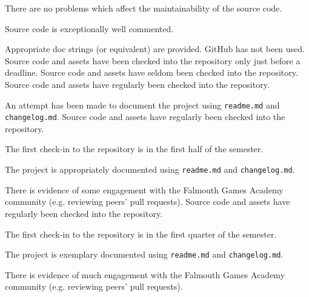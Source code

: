 \documentclass{../fal_assignment}
\begin{document}
\begin{markingrubric}
        \grade 		There are no problems which affect the maintainability of the source code.
        \par 		Source code is exceptionally well commented.
        \par 		Appropriate doc strings (or equivalent) are provided. 
%
        \grade\fail 	GitHub has not been used.
        \grade 		Source code and assets have been checked into the repository only just before a deadline.
        \grade 		Source code and assets have seldom been checked into the repository.
        \grade 		Source code and assets have regularly been checked into the repository.
        \par 		An attempt has been made to document the project using \texttt{readme.md} and \texttt{changelog.md}.
        \grade 		Source code and assets have regularly been checked into the repository.
        \par  		The first check-in to the repository is in the first half of the semester.
        \par 		The project is appropriately documented using \texttt{readme.md} and \texttt{changelog.md}.
        \par 		There is evidence of some engagement with the Falmouth Games Academy community (e.g. reviewing peers' pull requests).
        \grade 		Source code and assets have regularly been checked into the repository.
        \par  		The first check-in to the repository is in the first quarter of the semester.
        \par 		The project is exemplary documented using \texttt{readme.md} and \texttt{changelog.md}.
        \par 		There is evidence of much engagement with the Falmouth Games Academy community (e.g. reviewing peers' pull requests).
\end{markingrubric}
\end{document}
